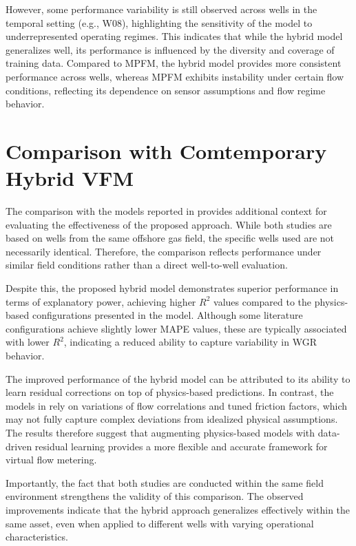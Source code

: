 \documentclass[12pt,APA]{uomthesis}
\begin{document}
However, some performance variability is still observed across wells in the temporal setting (e.g., W08), highlighting the sensitivity of the model to underrepresented operating regimes. This indicates that while the hybrid model generalizes well, its performance is influenced by the diversity and coverage of training data. Compared to MPFM, the hybrid model provides more consistent performance across wells, whereas MPFM exhibits instability under certain flow conditions, reflecting its dependence on sensor assumptions and flow regime behavior.

\section{Comparison with Comtemporary Hybrid VFM}
The comparison with the models reported in \citep{nemoto2023cloud} provides additional context for evaluating the effectiveness of the proposed approach. While both studies are based on wells from the same offshore gas field, the specific wells used are not necessarily identical. Therefore, the comparison reflects performance under similar field conditions rather than a direct well-to-well evaluation.

Despite this, the proposed hybrid model demonstrates superior performance in terms of explanatory power, achieving higher $R^2$ values compared to the physics-based configurations presented in the \citep{nemoto2023cloud} model. Although some literature configurations achieve slightly lower MAPE values, these are typically associated with lower $R^2$, indicating a reduced ability to capture variability in WGR behavior.

The improved performance of the hybrid model can be attributed to its ability to learn residual corrections on top of physics-based predictions. In contrast, the models in \citep{nemoto2023cloud} rely on variations of flow correlations and tuned friction factors, which may not fully capture complex deviations from idealized physical assumptions. The results therefore suggest that augmenting physics-based models with data-driven residual learning provides a more flexible and accurate framework for virtual flow metering.

Importantly, the fact that both studies are conducted within the same field environment strengthens the validity of this comparison. The observed improvements indicate that the hybrid approach generalizes effectively within the same asset, even when applied to different wells with varying operational characteristics.
\end{document}
